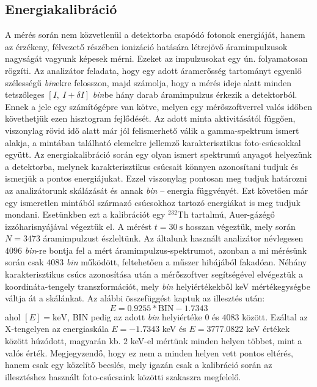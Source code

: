 \begin{multicols}{2}
\section{Energiakalibráció}
A mérés során nem közvetlenül a detektorba csapódó fotonok energiáját, hanem az érzékeny, félvezető részében ionizáció hatására létrejövő áramimpulzusok nagyságát vagyunk képesek mérni. Ezeket az impulzusokat egy ún.  folyamatosan rögzíti. Az analizátor feladata, hogy egy adott áramerősség tartományt egyenlő szélességű \emph{bin}ekre felosszon, majd számolja, hogy a mérés ideje alatt minden tetszőleges $\left[ I,\ I + \delta I \right]$ \emph{bin}be hány darab áramimpulzus érkezik a detektorból. Ennek a jele egy számítógépre van kötve, melyen egy mérőszoftverrel valós időben követhetjük ezen hisztogram fejlődését. Az adott minta aktivitásától függően, viszonylag rövid idő alatt már jól felismerhető válik a gamma-spektrum ismert alakja, a mintában található elemekre jellemző karakterisztikus foto-csúcsokkal együtt. \newline
Az energiakalibráció során egy olyan ismert spektrumú anyagot helyezünk a detektorba, melynek karakterisztikus csúcsait könnyen azonosítani tudjuk és ismerjük a pontos energiájukat. Ezzel viszonylag pontosan meg tudjuk határozni az analizátorunk skálázását és annak \emph{bin} -- energia függvényét. Ezt követően már egy ismeretlen mintából származó csúcsokhoz tartozó energiákat is meg tudjuk mondani. \newline
Esetünkben ezt a kalibrációt egy $^{232}$Th tartalmú, Auer-gázégő izzóharisnyájával végeztük el. A mérést $t = 30\ \text{s}$ hosszan végeztük, mely során $N = 3473$ áramimpulzust észleltünk. Az általunk használt analizátor névlegesen $4096$ \emph{bin}-re bontja fel a mért áramimpulzus-spektrumot, azonban a mi mérésünk során csak $4083$ \emph{bin} működött, feltehetően a műszer hibájából fakadóan. Néhány karakterisztikus csúcs azonosítása után a mérőszoftver segítségével elvégeztük a koordináta-tengely transzformációt, mely \emph{bin} helyiértékekből keV mértékegységbe váltja át a skálánkat. Az alábbi összefüggést kaptuk az illesztés után:
\begin{equation}
    E
    =
    0.9255 * \text{BIN} - 1.7343
\end{equation}
ahol $\left[ E \right] = \text{keV}$, BIN pedig az adott \emph{bin} helyiértéke $0$ és $4083$ között. Ezáltal az X-tengelyen az energiaskála $E = -1.7343$ keV és $E = 3777.0822$ keV értékek között húzódott, magyarán kb. $2$ keV-el mértünk minden helyen többet, mint a valós érték. Megjegyzendő, hogy ez nem a minden helyen vett pontos eltérés, hanem csak egy közelítő becslés, mely igazán csak a kalibráció során az illesztéshez használt foto-csúcsaink közötti szakaszra megfelelő.



\end{multicols}

